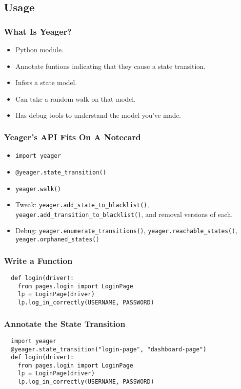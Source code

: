 \subsection{Usage}

\begin{frame}
  \frametitle{What Is Yeager?}
  \begin{itemize}
    \item Python module.
    \item Annotate funtions indicating that they cause a state transition.
    \item Infers a state model.
    \item Can take a random walk on that model.
    \item Has debug tools to understand the model you've made.
  \end{itemize}
\end{frame}

\begin{frame}
  \frametitle{Yeager's API Fits On A Notecard}
  \begin{itemize}
    \item \texttt{import yeager}
    \item \texttt{@yeager.state\_transition()}
    \item \texttt{yeager.walk()}
    \item Tweak: \texttt{yeager.add\_state\_to\_blacklist()}, \texttt{yeager.add\_transition\_to\_blacklist()}, and removal versions of each.
    \item Debug: \texttt{yeager.enumerate\_transitions()}, \texttt{yeager.reachable\_states()}, \texttt{yeager.orphaned\_states()}
  \end{itemize}
\end{frame}

\begin{frame}[fragile]
  \frametitle{Write a Function}
  \begin{lstlisting}
  def login(driver):
    from pages.login import LoginPage
    lp = LoginPage(driver)
    lp.log_in_correctly(USERNAME, PASSWORD)
  \end{lstlisting}
\end{frame}

\begin{frame}[fragile]
  \frametitle{Annotate the State Transition}
  \begin{lstlisting}
  import yeager
  @yeager.state_transition("login-page", "dashboard-page")
  def login(driver):
    from pages.login import LoginPage
    lp = LoginPage(driver)
    lp.log_in_correctly(USERNAME, PASSWORD)
  \end{lstlisting}
\end{frame}

